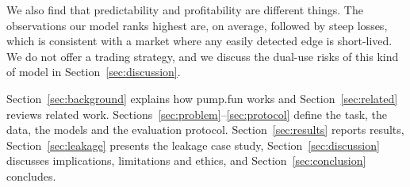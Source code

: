 We also find that predictability and profitability are different things. The observations our model ranks highest are, on average, followed by steep losses, which is consistent with a market where any easily detected edge is short-lived. We do not offer a trading strategy, and we discuss the dual-use risks of this kind of model in Section~\ref{sec:discussion}.

Section~\ref{sec:background} explains how pump.fun works and Section~\ref{sec:related} reviews related work. Sections~\ref{sec:problem}--\ref{sec:protocol} define the task, the data, the models and the evaluation protocol. Section~\ref{sec:results} reports results, Section~\ref{sec:leakage} presents the leakage case study, Section~\ref{sec:discussion} discusses implications, limitations and ethics, and Section~\ref{sec:conclusion} concludes.
